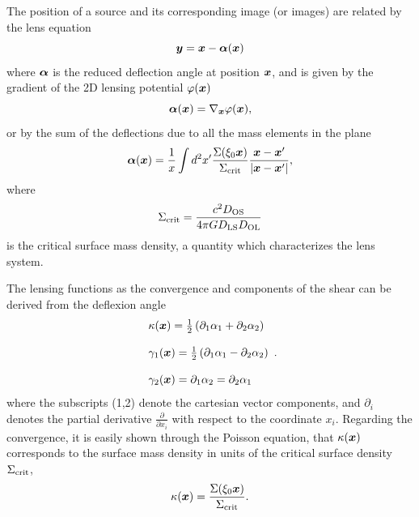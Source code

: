 \documentclass[useAMS,usenatbib]{mn2e}
\begin{document}
The position of a source and its corresponding image (or images) are related by the lens equation \citep{SEF}
\begin{equation}
\bmath{y}=\bmath{x}-\bmath{\alpha}(\bmath{x})
\label{lens_eq_ad}
\end{equation}
where $\bmath{\alpha}$ is the reduced deflection angle at position $\bmath{x}$, and is given by the gradient of the 2D lensing potential $\varphi(\bmath{x})$
\begin{equation}
\bmath{\alpha}(\bmath{x})=\nabla_{\bmath{x}}\varphi(\bmath{x}) \label{angled_ex1},
\end{equation}
or by the sum of the deflections due to all the mass elements in the plane
\begin{equation}
\bmath{\alpha}(\bmath{x})=\frac{1}{x}\int d^2x^\prime \frac{\Sigma(\xi_0\bmath{x})}{\Sigma_{\rm crit}}\frac{\bmath{x}-\bmath{x}^\prime}{|\bmath{x}-\bmath{x}^\prime|} \label{angled_ex2},
\end{equation}
where
\[
\Sigma_{\rm crit}=\frac{c^2 D_{\rm OS}}{4\pi G D_{\rm LS}D_{\rm OL}}
\]
is the critical surface mass density, a quantity which characterizes the lens system.

The lensing functions as the convergence and components of the shear can be derived from the deflexion angle
\begin{equation}\label{lens_functs_1}
\begin{array}{l}
\kappa(\bmath{x})=\frac{1}{2}\left(\partial_1 \alpha_1+ \partial_2 \alpha_2\right) \\
\\
\gamma_1(\bmath{x})=\frac{1}{2}\left(\partial_1 \alpha_1- \partial_2 \alpha_2\right) \\
\\
\gamma_2(\bmath{x})=\partial_1\alpha_2=\partial_2\alpha_1\\
\end{array}.
\end{equation}
where the subscripts (1,2) denote the cartesian vector components, and $\partial_i$ denotes the partial derivative $\frac{\partial}{\partial x_i}$ with respect to the coordinate $x_i$. Regarding the convergence, it is easily shown through the Poisson equation, that $\kappa(\bmath{x})$ corresponds to the surface mass density in units of the critical surface density $\Sigma_{\rm crit}$,
\begin{equation}
\kappa(\bmath{x})=\frac{\Sigma(\xi_0\bmath{x})}{\Sigma_{\rm crit}}.\label{def_conv}
\end{equation}
\end{document}
